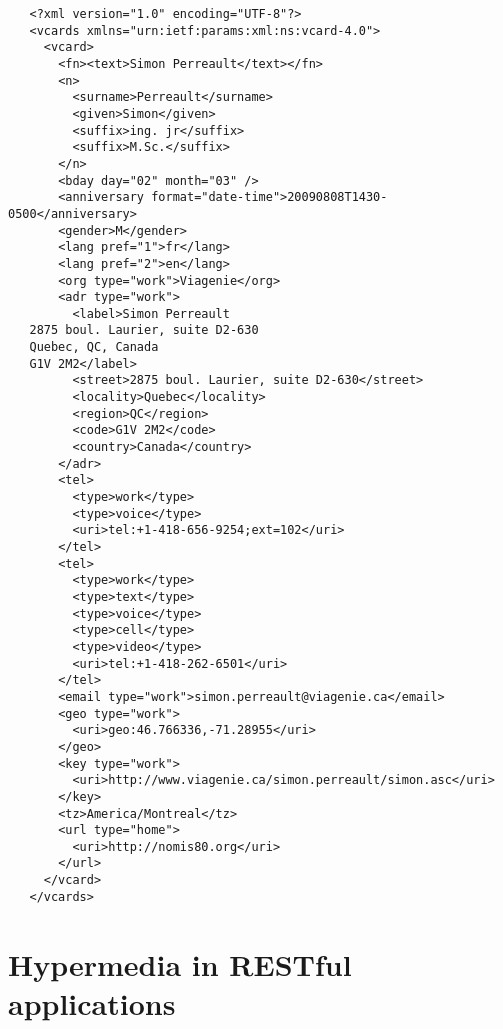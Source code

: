 \documentclass[12pt,a4paper]{scrartcl}		%
\begin{document}
\begin{verbatim}
   <?xml version="1.0" encoding="UTF-8"?>
   <vcards xmlns="urn:ietf:params:xml:ns:vcard-4.0">
     <vcard>
       <fn><text>Simon Perreault</text></fn>
       <n>
         <surname>Perreault</surname>
         <given>Simon</given>
         <suffix>ing. jr</suffix>
         <suffix>M.Sc.</suffix>
       </n>
       <bday day="02" month="03" />
       <anniversary format="date-time">20090808T1430-0500</anniversary>
       <gender>M</gender>
       <lang pref="1">fr</lang>
       <lang pref="2">en</lang>
       <org type="work">Viagenie</org>
       <adr type="work">
         <label>Simon Perreault
   2875 boul. Laurier, suite D2-630
   Quebec, QC, Canada
   G1V 2M2</label>
         <street>2875 boul. Laurier, suite D2-630</street>
         <locality>Quebec</locality>
         <region>QC</region>
         <code>G1V 2M2</code>
         <country>Canada</country>
       </adr>
       <tel>
         <type>work</type>
         <type>voice</type>
         <uri>tel:+1-418-656-9254;ext=102</uri>
       </tel>
       <tel>
         <type>work</type>
         <type>text</type>
         <type>voice</type>
         <type>cell</type>
         <type>video</type>
         <uri>tel:+1-418-262-6501</uri>
       </tel>
       <email type="work">simon.perreault@viagenie.ca</email>
       <geo type="work">
         <uri>geo:46.766336,-71.28955</uri>
       </geo>
       <key type="work">
         <uri>http://www.viagenie.ca/simon.perreault/simon.asc</uri>
       </key>
       <tz>America/Montreal</tz>
       <url type="home">
         <uri>http://nomis80.org</uri>
       </url>
     </vcard>
   </vcards>
\end{verbatim}


\section{Hypermedia in RESTful applications}


\end{document}
